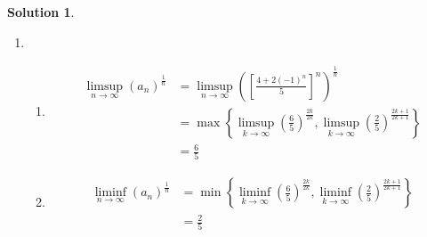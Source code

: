 \documentclass[12pt]{article}
\theoremstyle{definition} %
\newtheorem{solution}{Solution}
\theoremstyle{plain} %
\begin{document}
\begin{solution}
   \begin{enumerate}
    \item \begin{enumerate}
    \item           
              
              \begin{align}
                 \limsup_{n \to \infty} (a_n)^{\frac{1}{n}} &= \limsup_{n \to \infty} \left(\left[ \frac{4 + 2(-1)^n}{5} \right]^n\right)^{\frac{1}{n}} \\[10pt] 
                 &= \max \left\{ \limsup_{k \to \infty} \left( \frac{6}{5} \right)^{\frac{2k}{2k}}, \limsup_{k \to \infty} \left( \frac{2}{5} \right)^{\frac{2k+1}{2k+1}} \right\} \\[10pt]
                 &= \frac{6}{5}
              \end{align}
              
              \item 
              \begin{align}
                 \liminf_{n \to \infty} (a_n)^{\frac{1}{n}} &= \min \left\{ \liminf_{k \to \infty} \left( \frac{6}{5} \right)^{\frac{2k}{2k}}, \liminf_{k \to \infty} \left( \frac{2}{5} \right)^{\frac{2k+1}{2k+1}} \right\} \\[10pt]
                 &= \frac{2}{5}
              \end{align}
     

\end{enumerate}
\end{enumerate}
\end{solution}
\end{document}
